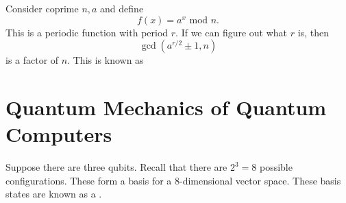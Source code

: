 \documentclass{article}
\numberwithin{equation}{section}
\begin{document}
Consider coprime $n,a$ and define 
\begin{equation}
    f(x) = a^x \text{ mod } n.
\end{equation} 
This is a periodic function with period $r$. If we can figure out what $r$ is, then
\begin{equation}
    \gcd(a^{r/2} \pm 1, n)
\end{equation}
is a factor of $n$. This is known as 
\section{Quantum Mechanics of Quantum Computers}
Suppose there are three qubits. Recall that there are $2^3=8$ possible configurations. These form a basis for a $8$-dimensional vector space. These basis states are known as a .
\end{document}
